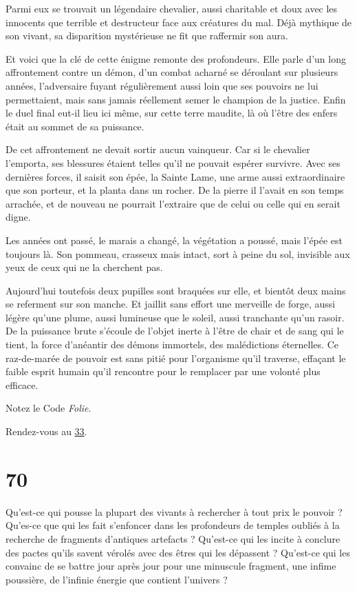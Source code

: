 \documentclass{report}
\newcommand{\gsection}[1]{
    \section{#1}
    \label{section-#1}
}
\newcommand{\glink}[1]{\hyperref[section-#1]{#1}}
\begin{document}
Parmi eux se trouvait un légendaire chevalier, aussi charitable et doux avec les innocents que terrible et destructeur face aux créatures du mal. Déjà mythique de son vivant, sa disparition mystérieuse ne fit que raffermir son aura.

Et voici que la clé de cette énigme remonte des profondeurs. Elle parle d'un long affrontement contre un démon, d'un combat acharné se déroulant sur plusieurs années, l'adversaire fuyant régulièrement aussi loin que ses pouvoirs ne lui permettaient, mais sans jamais réellement semer le champion de la justice. Enfin le duel final eut-il lieu ici même, sur cette terre maudite, là où l'être des enfers était au sommet de sa puissance.

De cet affrontement ne devait sortir aucun vainqueur. Car si le chevalier l'emporta, ses blessures étaient telles qu'il ne pouvait espérer survivre. Avec ses dernières forces, il saisit son épée, la Sainte Lame, une arme aussi extraordinaire que son porteur, et la planta dans un rocher. De la pierre il l'avait en son temps arrachée, et de nouveau ne pourrait l'extraire que de celui ou celle qui en serait digne.

Les années ont passé, le marais a changé, la végétation a poussé, mais l'épée est toujours là. Son pommeau, crasseux mais intact, sort à peine du sol, invisible aux yeux de ceux qui ne la cherchent pas.

Aujourd'hui toutefois deux pupilles sont braquées sur elle, et bientôt deux mains se referment sur son manche. Et jaillit sans effort une merveille de forge, aussi légère qu'une plume, aussi lumineuse que le soleil, aussi tranchante qu'un rasoir. De la puissance brute s'écoule de l'objet inerte à l'être de chair et de sang qui le tient, la force d'anéantir des démons immortels, des malédictions éternelles. Ce raz-de-marée de pouvoir est sans pitié pour l'organisme qu'il traverse, effaçant le faible esprit humain qu'il rencontre pour le remplacer par une volonté plus efficace.

Notez le Code \emph{Folie}.

Rendez-vous au \glink{33}.

\gsection{70}

Qu'est-ce qui pousse la plupart des vivants à rechercher à tout prix le pouvoir ? Qu'es-ce que qui les fait s'enfoncer dans les profondeurs de temples oubliés à la recherche de fragments d'antiques artefacts ? Qu'est-ce qui les incite à conclure des pactes qu'ils savent vérolés avec des êtres qui les dépassent ? Qu'est-ce qui les convainc de se battre jour après jour pour une minuscule fragment, une infime poussière, de l'infinie énergie que contient l'univers ?
\end{document}
